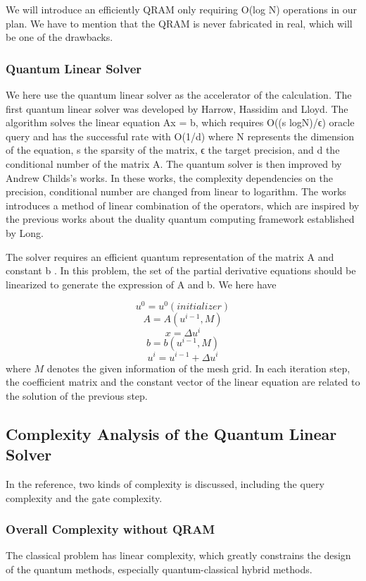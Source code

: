 \documentclass[%
 reprint,
 amsmath,amssymb,
pra,
]{revtex4-1}
\begin{document}
We will introduce an efficiently QRAM only requiring O(log N) operations in our plan. We have to mention that the QRAM is never fabricated in real, which will be one of the drawbacks.

\subsubsection{Quantum Linear Solver}

We here use the quantum linear solver as the accelerator of the calculation. The first quantum linear solver was developed by Harrow, Hassidim and Lloyd. The algorithm solves the linear equation Ax = b, which requires O((s log⁡N)/ϵ) oracle query and has the successful rate with O(1/d) where N represents the dimension of the equation, s the sparsity of the matrix, ϵ the target precision, and d the conditional number of the matrix A. The quantum solver is then improved by Andrew Childs’s works. In these works, the complexity dependencies on the precision, conditional number are changed from linear to logarithm. The works introduces a method of linear combination of the operators, which are inspired by the previous works about the duality quantum computing framework established by Long.

The solver requires an efficient quantum representation of the matrix A and constant b ⃗. In this problem, the set of the partial derivative equations should be linearized to generate the expression of A and b. We here have

$$
u^0=u^0(initializer)
$$
$$
A=A(u^{i-1},M)
$$
$$
x=\Delta u^i
$$
$$
b=b(u^{i-1},M)
$$
$$
u^i=u^{i-1}+\Delta u^i
$$
where $M$ denotes the given information of the mesh grid. In each iteration step, the coefficient matrix and the constant vector of the linear equation are related to the solution of the previous step.

\subsection{Complexity Analysis of the Quantum Linear Solver }


In the reference, two kinds of complexity is discussed, including the query complexity and the gate complexity.

\subsubsection{Overall Complexity without QRAM }


The classical problem has linear complexity, which greatly constrains the design of the quantum methods, especially quantum-classical hybrid methods. 
\end{document}
